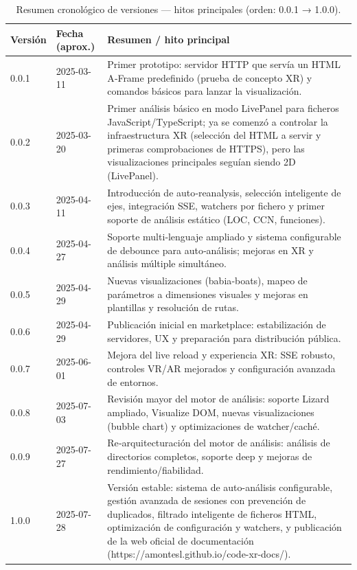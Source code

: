 \documentclass[a4paper, 12pt]{book}
\begin{document}
\begin{table}[H]
\centering\small
\begin{tabular}{p{2.2cm} p{2.8cm} p{9.0cm}}
\hline
\textbf{Versión} & \textbf{Fecha (aprox.)} & \textbf{Resumen / hito principal} \\
\hline
0.0.1 & 2025-03-11 & Primer prototipo: servidor HTTP que servía un HTML A‑Frame predefinido (prueba de concepto XR) y comandos básicos para lanzar la visualización. \\
0.0.2 & 2025-03-20 & Primer análisis básico en modo LivePanel para ficheros JavaScript/TypeScript; ya se comenzó a controlar la infraestructura XR (selección del HTML a servir y primeras comprobaciones de HTTPS), pero las visualizaciones principales seguían siendo 2D (LivePanel). \\
0.0.3 & 2025-04-11 & Introducción de auto‑reanalysis, selección inteligente de ejes, integración SSE, watchers por fichero y primer soporte de análisis estático (LOC, CCN, funciones). \\
0.0.4 & 2025-04-27 & Soporte multi‑lenguaje ampliado y sistema configurable de debounce para auto‑análisis; mejoras en XR y análisis múltiple simultáneo. \\
0.0.5 & 2025-04-29 & Nuevas visualizaciones (babia‑boats), mapeo de parámetros a dimensiones visuales y mejoras en plantillas y resolución de rutas. \\
0.0.6 & 2025-04-29 & Publicación inicial en marketplace: estabilización de servidores, UX y preparación para distribución pública. \\
0.0.7 & 2025-06-01 & Mejora del live reload y experiencia XR: SSE robusto, controles VR/AR mejorados y configuración avanzada de entornos. \\
0.0.8 & 2025-07-03 & Revisión mayor del motor de análisis: soporte Lizard ampliado, Visualize DOM, nuevas visualizaciones (bubble chart) y optimizaciones de watcher/caché. \\
0.0.9 & 2025-07-27 & Re‑arquitecturación del motor de análisis: análisis de directorios completos, soporte deep y mejoras de rendimiento/fiabilidad. \\
1.0.0 & 2025-07-28 & Versión estable: sistema de auto-análisis configurable, gestión avanzada de sesiones con prevención de duplicados, filtrado inteligente de ficheros HTML, optimización de configuración y watchers, y publicación de la web oficial de documentación (https://amontesl.github.io/code-xr-docs/). \\
\hline
\end{tabular}
\caption{Resumen cronológico de versiones — hitos principales (orden: 0.0.1 → 1.0.0).}
\label{tab:changelog}
\end{table}
\end{document}
